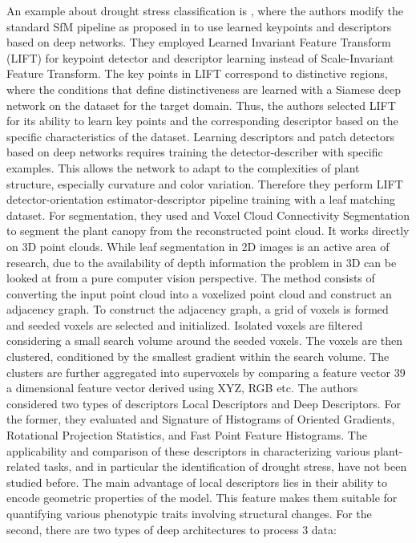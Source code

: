 An example about drought stress classification is \cite{srivastava2017drought}, where the authors modify the standard SfM pipeline\cite{snavely2006photo} as proposed in to use learned keypoints and descriptors based on deep networks. They employed Learned Invariant Feature
Transform (LIFT)\cite{yi2016lift} for keypoint detector and descriptor learning instead of Scale-Invariant Feature Transform\cite{lowe1999object}. The key points in LIFT correspond to distinctive regions,
where the conditions that define distinctiveness are learned with a Siamese deep network on the dataset for the target domain. Thus, the authors selected LIFT for its
ability to learn key points and the corresponding descriptor based on the specific characteristics of the dataset. Learning descriptors and patch detectors based on deep
networks requires training the detector-describer with specific examples. This allows the network to adapt to the complexities of plant structure, especially curvature
and color variation. Therefore they perform LIFT detector-orientation estimator-descriptor pipeline training with a leaf matching dataset. For segmentation, they used
and Voxel Cloud Connectivity Segmentation to segment the plant canopy from the reconstructed point cloud. It works directly on 3D point clouds. While leaf segmentation
in 2D images is an active area of research, due to the availability of depth information the problem in 3D can be looked at from a pure computer vision perspective. The
method consists of converting the input point cloud into a voxelized point cloud and construct an adjacency graph. To construct the adjacency graph, a grid of voxels is
formed and seeded voxels are selected and initialized. Isolated voxels are filtered considering a small search volume around the seeded voxels. The voxels are then
clustered, conditioned by the smallest gradient within the search volume. The clusters are further aggregated into supervoxels by comparing a feature vector 39 a
dimensional feature vector derived using XYZ, RGB etc. The authors considered two types of descriptors Local Descriptors and Deep Descriptors. For the former,
they evaluated and Signature of Histograms of Oriented Gradients, Rotational Projection Statistics, and Fast Point Feature Histograms. The applicability and comparison
of these descriptors in characterizing various plant-related tasks, and in particular the identification of drought stress, have not been studied before.
The main advantage of local descriptors lies in their ability to encode geometric properties of the model. This feature makes them suitable for quantifying various
phenotypic traits involving structural changes. For the second, there are two types of deep architectures to process 3 data:

